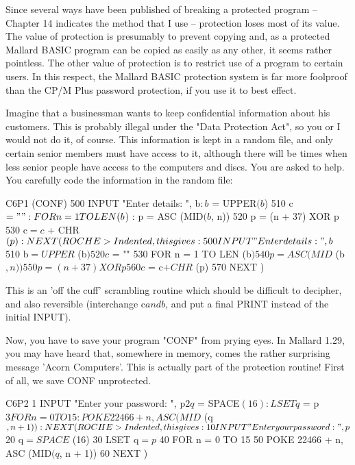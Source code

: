 Since  several  ways have been published of breaking a  protected  program  -- 
Chapter  14  indicates the method that I use -- protection loses most  of  its 
value.  The  value of protection is presumably to prevent copying  and,  as  a 
protected Mallard BASIC program can be copied as easily as any other, it seems 
rather  pointless.  The  other value of protection is to  restrict  use  of  a 
program to certain users. In this respect, the Mallard BASIC protection system 
is far more foolproof than the CP/M Plus password protection, if you use it to 
best effect.

Imagine  that a businessman wants to keep confidential information  about  his 
customers. This is probably illegal under the "Data Protection Act", so you or 
I  would not do it, of course. This information is kept in a random file,  and 
only  certain  senior members must have access to it, although there  will  be 
times when less senior people have access to the computers and discs. You  are 
asked to help. You carefully code the information in the random file:

        C6P1  (CONF)
        500 INPUT "Enter details: ", b$ : b$ = UPPER$ (b$)
        510 c$ = "" : FOR n = 1 TO LEN (b$) : p = ASC (MID$ (b$, n))
        520 p = (n + 37) XOR p
        530 c$ = c$ + CHR$ (p) : NEXT

(ROCHE> Indented, this gives:

        500 INPUT "Enter details: ", b$
        510 b$ = UPPER$ (b$)
        520 c$ = ""
        530 FOR n = 1 TO LEN (b$)
        540     p = ASC (MID$ (b$, n))
        550     p = (n + 37) XOR p
        560     c$ = c$ + CHR$ (p)
        570 NEXT
)

This  is  an 'off the cuff' scrambling routine which should  be  difficult  to 
decipher,  and also reversible (interchange c$ and b$, and put a  final  PRINT 
instead of the initial INPUT).

Now,  you have to save your program "CONF" from prying eyes. In Mallard  1.29, 
you  may  have heard that, somewhere in memory, comes  the  rather  surprising 
message  'Acorn Computers'. This is actually part of the  protection  routine! 
First of all, we save CONF unprotected.

        C6P2
        1 INPUT "Enter your password: ", p$
        2 q$ = SPACE$ (16) : LSET q$ = p$
        3 FOR n = 0 TO 15 : POKE 22466 + n, ASC (MID$ (q$, n + 1)) : NEXT

(ROCHE> Indented, this gives:

        10 INPUT "Enter your password: ", p$
        20 q$ = SPACE$ (16)
        30 LSET q$ = p$
        40 FOR n = 0 TO 15
        50     POKE 22466 + n, ASC (MID$ (q$, n + 1))
        60 NEXT
)

